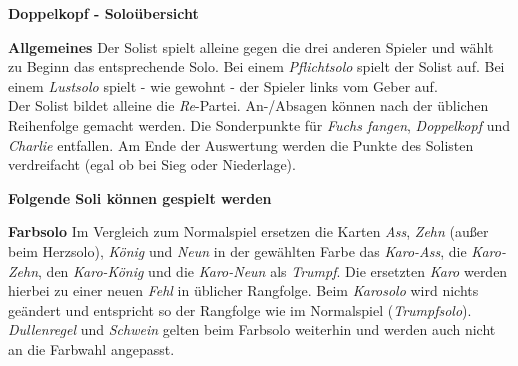 \documentclass[11pt,a4paper,landscape]{article}
\begin{document}
\begin{center}
\textbf{Doppelkopf - Soloübersicht}
\end{center}

\begin{multicols}{3}


\textbf{Allgemeines} Der Solist spielt alleine gegen die drei anderen Spieler und wählt zu Beginn das entsprechende Solo. Bei einem \textit{Pflichtsolo} spielt der Solist auf. Bei einem \textit{Lustsolo} spielt - wie gewohnt - der Spieler links vom Geber auf. \\
Der Solist bildet alleine die \textit{Re}-Partei. An-/Absagen können nach der üblichen Reihenfolge gemacht werden. Die Sonderpunkte für \textit{Fuchs fangen}, \textit{Doppelkopf} und \textit{Charlie} entfallen. Am Ende der Auswertung werden die Punkte des Solisten verdreifacht (egal ob bei Sieg oder Niederlage). 

\begin{center}
\textbf{Folgende Soli können gespielt werden} \\
\end{center}

\textbf{Farbsolo} Im Vergleich zum Normalspiel ersetzen die Karten \textit{Ass}, \textit{Zehn} (außer beim Herzsolo), \textit{König} und \textit{Neun} in der gewählten Farbe das \textit{Karo-Ass}, die \textit{Karo-Zehn}, den \textit{Karo-König} und die \textit{Karo-Neun} als \textit{Trumpf}. Die ersetzten \textit{Karo} werden hierbei zu einer neuen \textit{Fehl} in üblicher Rangfolge. Beim \textit{Karosolo} wird nichts geändert und entspricht so der Rangfolge wie im Normalspiel (\textit{Trumpfsolo}). \textit{Dullenregel} und \textit{Schwein} gelten beim Farbsolo weiterhin und werden auch nicht an die Farbwahl angepasst.


\end{multicols}
\end{document}

